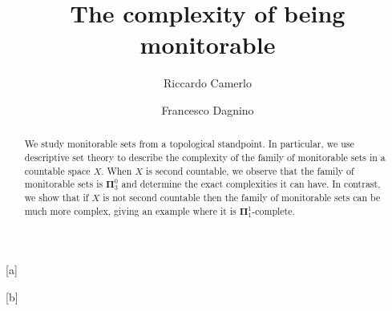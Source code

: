 \documentclass{lmcs}
\newcommand{\bpi}{\boldsymbol\Pi}
\def\eg{{\em e.g.}}
\begin{document}
\title{The complexity of being monitorable} 

\author[R.~Camerlo]{Riccardo Camerlo}[a]
\author[F.~Dagnino]{Francesco Dagnino}[b] 

\address{DIMA - Universit\`a di Genova}	%

\address{DIBRIS - Universit\`a di Genova}	%




\begin{abstract}
\noindent We study monitorable sets from a topological standpoint.
In particular, we use descriptive set theory to describe the complexity of the family of monitorable sets in a countable space $X$.
When $X$ is second countable, we observe that the family of monitorable sets is $\bpi^0_3$ and determine the exact complexities it can have.
In contrast, we show that if $X$ is not second countable then the family of monitorable sets can be much more complex, giving an example where it is $ \bpi^1_1$-complete.
\end{abstract}

\maketitle
\end{document}
